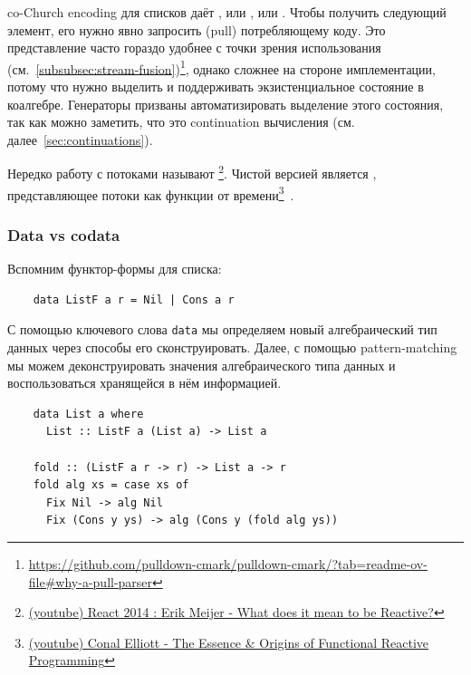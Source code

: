 co-Church encoding для списков даёт , или , или .
Чтобы получить следующий элемент, его нужно явно запросить (pull) потребляющему коду.
Это представление часто гораздо удобнее с точки зрения использования (см.~\ref{subsubsec:stream-fusion})\footnote{\url{https://github.com/pulldown-cmark/pulldown-cmark/?tab=readme-ov-file\#why-a-pull-parser}}, однако сложнее на стороне имплементации, потому что нужно выделить и поддерживать экзистенциальное состояние в коалгебре.
Генераторы призваны автоматизировать выделение этого состояния, так как можно заметить, что это continuation вычисления (см. далее~\ref{sec:continuations}).

Нередко работу с потоками называют \footnote{\href{https://youtu.be/sTSQlYX5DU0?si=Xhfi62ScXHBBjdBx}{(youtube) React 2014 : Erik Meijer - What does it mean to be Reactive?}}.
Чистой версией является , представляющее потоки как функции от времени\footnote{\href{https://youtu.be/rfmkzp76M4M?si=TRBq8wWbcDOhSbIO}{(youtube) Conal Elliott - The Essence \& Origins of Functional Reactive Programming}}~\cite{elliott1997functional}.

\subsubsection{Data vs codata} \label{subsubsec:data-codata}

Вспомним функтор-формы для списка:
\begin{verbatim}
    data ListF a r = Nil | Cons a r
\end{verbatim}

С помощью ключевого слова \texttt{data} мы определяем новый алгебраический тип данных через способы его сконструировать.
Далее, с помощью pattern-matching мы можем деконструировать значения алгебраического типа данных и воспользоваться хранящейся в нём информацией.
\begin{verbatim}
    data List a where
      List :: ListF a (List a) -> List a

    fold :: (ListF a r -> r) -> List a -> r
    fold alg xs = case xs of
      Fix Nil -> alg Nil
      Fix (Cons y ys) -> alg (Cons y (fold alg ys))
\end{verbatim}

